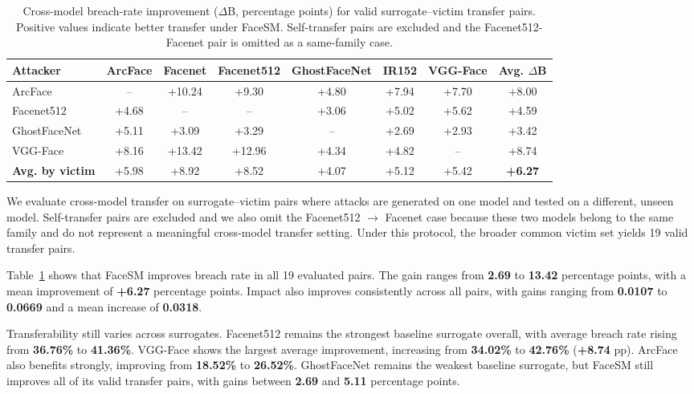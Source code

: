 \documentclass[a4paper,fleqn]{cas-dc}
\begin{document}
\begin{table}[t]
\centering
\caption{Cross-model breach-rate improvement ($\Delta$B, percentage points) for valid surrogate--victim transfer pairs. Positive values indicate better transfer under FaceSM. Self-transfer pairs are excluded and the Facenet512-Facenet pair is omitted as a same-family case.}
\label{tab:cross_model}
\setlength{\tabcolsep}{5pt}
\renewcommand{\arraystretch}{1.15}
\begin{tabular}{lccccccc}
\toprule
\textbf{Attacker} & \textbf{ArcFace} & \textbf{Facenet} & \textbf{Facenet512} & \textbf{GhostFaceNet} & \textbf{IR152} & \textbf{VGG-Face} & \textbf{Avg. $\Delta$B} \\
\midrule
ArcFace      & --    & +10.24 & +9.30  & +4.80 & +7.94 & +7.70 & +8.00 \\
Facenet512   & +4.68 & --     & --     & +3.06 & +5.02 & +5.62 & +4.59 \\
GhostFaceNet & +5.11 & +3.09  & +3.29  & --    & +2.69 & +2.93 & +3.42 \\
VGG-Face     & +8.16 & +13.42 & +12.96 & +4.34 & +4.82 & --    & +8.74 \\
\midrule
\textbf{Avg. by victim} & +5.98 & +8.92 & +8.52 & +4.07 & +5.12 & +5.42 & \textbf{+6.27} \\
\bottomrule
\end{tabular}
\end{table}

We evaluate cross-model transfer on surrogate--victim pairs where attacks are generated on one model and tested on a different, unseen model. Self-transfer pairs are excluded and we also omit the Facenet512 $\rightarrow$ Facenet case because these two models belong to the same family and do not represent a meaningful cross-model transfer setting. Under this protocol, the broader common victim set yields 19 valid transfer pairs.

Table~\ref{tab:cross_model} shows that FaceSM improves breach rate in all 19 evaluated pairs. The gain ranges from \textbf{2.69} to \textbf{13.42} percentage points, with a mean improvement of \textbf{+6.27} percentage points. Impact also improves consistently across all pairs, with gains ranging from \textbf{0.0107} to \textbf{0.0669} and a mean increase of \textbf{0.0318}.

Transferability still varies across surrogates. Facenet512 remains the strongest baseline surrogate overall, with average breach rate rising from \textbf{36.76\%} to \textbf{41.36\%}. VGG-Face shows the largest average improvement, increasing from \textbf{34.02\%} to \textbf{42.76\%} (\textbf{+8.74} pp). ArcFace also benefits strongly, improving from \textbf{18.52\%} to \textbf{26.52\%}. GhostFaceNet remains the weakest baseline surrogate, but FaceSM still improves all of its valid transfer pairs, with gains between \textbf{2.69} and \textbf{5.11} percentage points.
\end{document}
